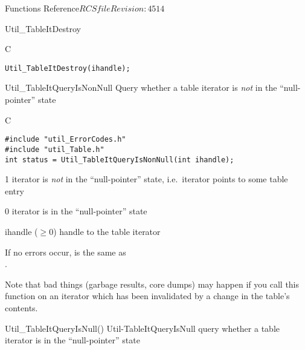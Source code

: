 \begin{cactuspart}{ Functions Reference}{$RCSfile$}{$Revision: 4514 $}
\begin{FunctionDescription}{Util\_TableItDestroy}
\begin{ExampleSection}
\begin{Example}{C}
\begin{verbatim}
Util_TableItDestroy(ihandle);
\end{verbatim}
\end{Example}
\end{ExampleSection}
\end{FunctionDescription}


\begin{FunctionDescription}{Util\_TableItQueryIsNonNull}
\label{Util-TableItQueryIsNonNull}
Query whether a table iterator is {\em not\/} in the ``null-pointer'' state

\begin{SynopsisSection}
\begin{Synopsis}{C}
\begin{verbatim}
#include "util_ErrorCodes.h"
#include "util_Table.h"
int status = Util_TableItQueryIsNonNull(int ihandle);
\end{verbatim}
\end{Synopsis}
\end{SynopsisSection}

\begin{ResultSection}
\begin{Result}{\rm 1}
iterator is {\em not\/} in the ``null-pointer'' state,
i.e.\ iterator points to some table entry
\end{Result}
\begin{Result}{\rm 0}
iterator is in the ``null-pointer'' state
\end{Result}
\end{ResultSection}

\begin{ParameterSection}
\begin{Parameter}{ihandle ($\ge 0$)}
handle to the table iterator
\end{Parameter}
\end{ParameterSection}

\begin{Discussion}
If no errors occur,
is the same as\\
.

Note that bad things (garbage results, core dumps) may happen if
you call this function on an iterator which has been invalidated
by a change in the table's contents.
\end{Discussion}

\begin{SeeAlsoSection}
\begin{SeeAlso2} {Util\_TableItQueryIsNull()} {Util-TableItQueryIsNull}
query whether a table iterator is in the ``null-pointer'' state
\end{SeeAlso2}
\end{SeeAlsoSection}


\end{FunctionDescription}
\end{cactuspart}

